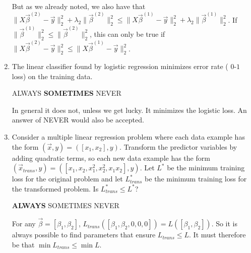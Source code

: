 \documentclass[10pt]{article}
\begin{document}
\begin{enumerate}[label=(\alph*)]
	But as we already noted, we also have that $\|X\vec{\beta}^{(2)} - \vec{y}\|_2^2 + \lambda_2 \|\vec{\beta}^{(2)}\|_2^2 \leq \|X\vec{\beta}^{(1)} - \vec{y}\|_2^2 + \lambda_2 \|\vec{\beta}^{(1)}\|_2^2$. If $ \|\vec{\beta}^{(1)}\|_2^2 \leq  \|\vec{\beta}^{(2)}\|_2^2$, this can only be true if $\|X\vec{\beta}^{(2)}  - \vec{y}\|_2^2 \leq \|X\vec{\beta}^{(1)}  - \vec{y}\|_2^2$.
	\color{black}
	\vspace{1em}
	
	
	
	\item The linear classifier found by logistic regression minimizes error rate ( $0$-$1$ loss)  on the training data. 
	
	ALWAYS\hspace{1em} \textbf{SOMETIMES}\hspace{1em} NEVER
		
	\color{blue}
	In general it does not, unless we get lucky. It minimizes the logistic loss. An answer of NEVER would also be accepted.
	\color{black}
	\vspace{1em}
	
%	
	
	\item Consider a multiple linear regression problem where each data example has the form $(\vec{x},y) = ([x_1,x_2],y)$. Transform the predictor variables by adding quadratic terms, so each new data example has the form $(\vec{x}_{trans},y)= ([x_1,x_2,x_1^2, x_2^2, x_1x_2],y)$. Let $L^*$ be the minimum training loss for the original problem and let ${L}_{trans}^*$ be the minimum training loss for the transformed problem. Is ${L}_{trans}^* \leq L^*$?
	
	\textbf{ALWAYS}\hspace{1em} SOMETIMES\hspace{1em} NEVER
	
	\color{blue}
	For any $\vec{\beta} = [\beta_1,\beta_2]$, $L_{trans}([\beta_1,\beta_2, 0,0,0]) = L([\beta_1,\beta_2])$. So it is always possible to find parameters that ensure $L_{trans} \leq L$. It must therefore be that $\min L_{trans} \leq \min L$. 
	\color{black}
	\vspace{1em}
	
	

\end{enumerate}
\end{document}
